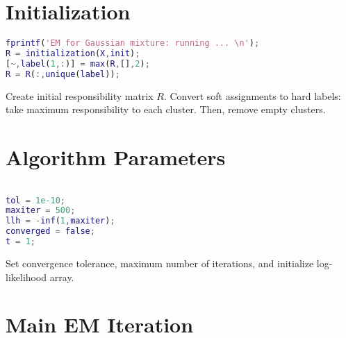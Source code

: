 \documentclass[11pt]{article}
\begin{document}
\vspace{0.5cm}

\section{Initialization}

\begin{minipage}{\textwidth}
\begin{minipage}[t]{0.48\textwidth}
\begin{lstlisting}[language=Matlab, firstnumber=6]
%% initialization
fprintf('EM for Gaussian mixture: running ... \n');
R = initialization(X,init);
[~,label(1,:)] = max(R,[],2);
R = R(:,unique(label));
\end{lstlisting}
\end{minipage}
\hfill
\begin{minipage}[t]{0.48\textwidth}
Create initial responsibility matrix $R$.
Convert soft assignments to hard labels: take maximum responsibility to each cluster.
Then, remove empty clusters.
\end{minipage}
\end{minipage}

\vspace{0.5cm}

\section{Algorithm Parameters}

\begin{minipage}{\textwidth}
\begin{minipage}[t]{0.48\textwidth}
\begin{lstlisting}[language=Matlab, firstnumber=11]

tol = 1e-10;
maxiter = 500;
llh = -inf(1,maxiter);
converged = false;
t = 1;
\end{lstlisting}
\end{minipage}
\hfill
\begin{minipage}[t]{0.48\textwidth}
Set convergence tolerance, maximum number of iterations, and initialize log-likelihood array.
\end{minipage}
\end{minipage}

\vspace{0.5cm}

\section{Main EM Iteration}
\end{document}
